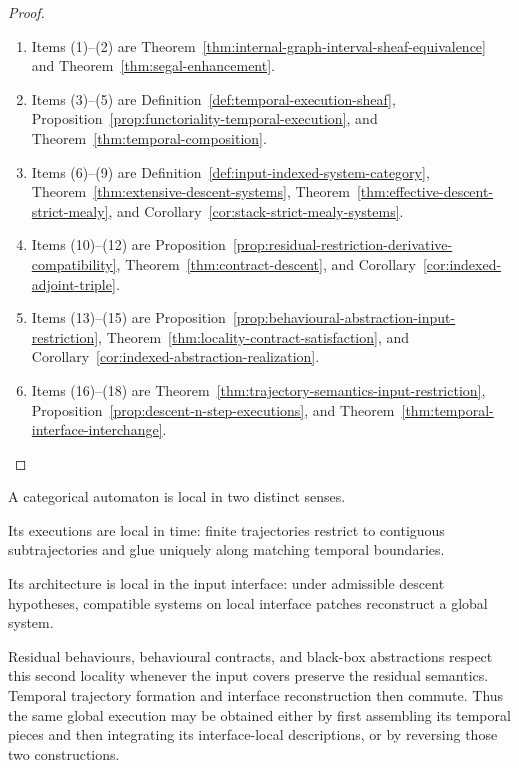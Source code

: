 \begin{proof}
\leavevmode
\begin{enumerate}
    \item Items (1)--(2) are
    Theorem~\ref{thm:internal-graph-interval-sheaf-equivalence} and
    Theorem~\ref{thm:segal-enhancement}.

    \item Items (3)--(5) are
    Definition~\ref{def:temporal-execution-sheaf},
    Proposition~\ref{prop:functoriality-temporal-execution}, and
    Theorem~\ref{thm:temporal-composition}.

    \item Items (6)--(9) are
    Definition~\ref{def:input-indexed-system-category},
    Theorem~\ref{thm:extensive-descent-systems},
    Theorem~\ref{thm:effective-descent-strict-mealy}, and
    Corollary~\ref{cor:stack-strict-mealy-systems}.

    \item Items (10)--(12) are
    Proposition~\ref{prop:residual-restriction-derivative-compatibility},
    Theorem~\ref{thm:contract-descent}, and
    Corollary~\ref{cor:indexed-adjoint-triple}.

    \item Items (13)--(15) are
    Proposition~\ref{prop:behavioural-abstraction-input-restriction},
    Theorem~\ref{thm:locality-contract-satisfaction}, and
    Corollary~\ref{cor:indexed-abstraction-realization}.

    \item Items (16)--(18) are
    Theorem~\ref{thm:trajectory-semantics-input-restriction},
    Proposition~\ref{prop:descent-n-step-executions}, and
    Theorem~\ref{thm:temporal-interface-interchange}.
\end{enumerate}
\end{proof}

\begin{remark}
\label{rem:temporal-interface-final-summary}
A categorical automaton is local in two distinct senses.

Its executions are local in time: finite trajectories restrict to contiguous
subtrajectories and glue uniquely along matching temporal boundaries.

Its architecture is local in the input interface: under admissible descent
hypotheses, compatible systems on local interface patches reconstruct a
global system.

Residual behaviours, behavioural contracts, and black-box abstractions respect
this second locality whenever the input covers preserve the residual
semantics. Temporal trajectory formation and interface reconstruction then
commute. Thus the same global execution may be obtained either by first
assembling its temporal pieces and then integrating its interface-local
descriptions, or by reversing those two constructions.
\end{remark}